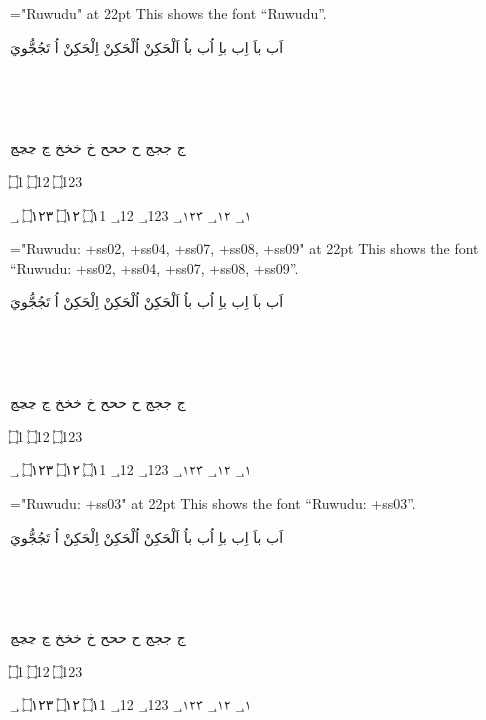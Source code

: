 

\vsize=9.5in
\nopagenumbers
\parindent=0pt
\def\testFont#1{
  \font\x="#1" at 22pt \x
    This shows the font “#1”. \par\touching\par\imala\par\wagaf\par\jeem\par\endayahA\par\endayahB \number\par}

\baselineskip=20pt

\def\touching{\beginR اَب باَ  اِب باِ اُب باُ  اَلْحَكِنْ اُلْحَكِنْ اِلْحَكِنْ  اُ تَجُجُّويَ  \endR} %
\def\number{\beginR ؀1 ؀12 ؀123 ؀١ ؀١٢ ؀١٢٣ \endR} 
\def\endayahA{\beginR ۝1   ۝12   ۝123   \endR} %
\def\endayahB{\beginR ۝١   ۝١٢   ۝١٢٣ \endR} %
\def\imala{\beginR بٜ  \endR} %
\def\wagaf{\beginR ؿ ؿؿؿ ڟ ڟڟڟ ݑ ݑݑݑ ݣ ݣݣݣ ࣃ ࣃࣃࣃ ࣄ ࣄࣄࣄ \endR} %
\def\jeem{\beginR ج ججج ح ححح خ خخخ ڃ ڃڃڃ   \endR} %
\def\lamalef{\beginR لإ ‍لإ لَإِ ‍لَإِ لأ ‍لأ لَأَ ‍لَأَ لإ ‍لإ لَإِ ‍لَإِ لأ ‍لأ لَأَ ‍لَأَ لآ ‍لآ لَآَ ‍لَآَ لا ‍لا لَاَ ‍لَاَ \endR} 
\bigskip


\testFont{Ruwudu}

\bigskip

\testFont{Ruwudu:
       +ss02, +ss04, +ss07, +ss08, +ss09}

\bigskip

\testFont{Ruwudu:
       +ss03}

\bigskip


\bigskip

\bye

